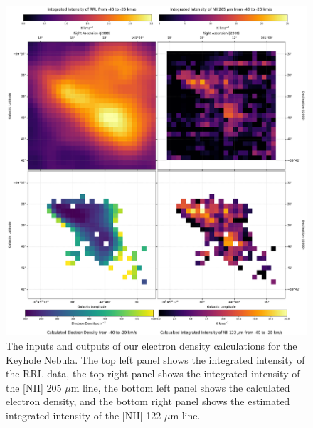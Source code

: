 \begin{figure}
    \centering
    \includegraphics[width=.9\textwidth]{figs/carina/keyhole/keyhole.png}
    \caption[Calculated Electron Density and {[}NII{]} 122 $\mu$m Maps for the Keyhole Nebula]{
        The inputs and outputs of our electron density calculations for the Keyhole Nebula.
        The top left panel shows the integrated intensity of the RRL data, the top right panel shows the integrated intensity of the [NII] 205 $\mu$m line, the bottom left panel shows the calculated electron density, and the bottom right panel shows the estimated integrated intensity of the [NII] 122 $\mu$m line.
        }
    \label{carina/fig:result_keyhole}
\end{figure}

